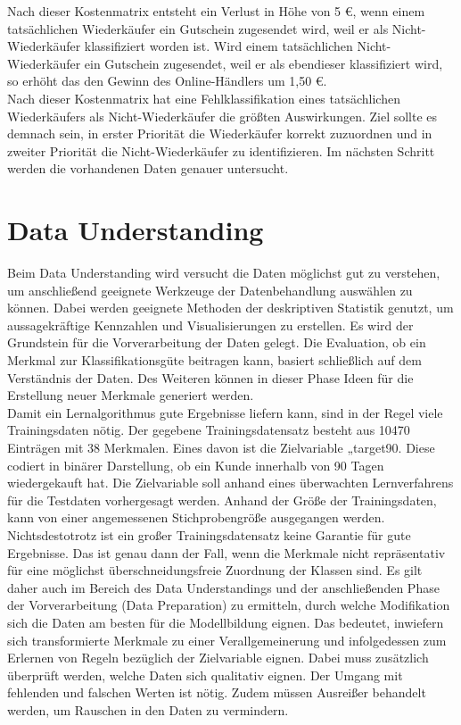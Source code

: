 Nach dieser Kostenmatrix entsteht ein Verlust in Höhe von 5 \euro{}, wenn einem tatsächlichen Wiederkäufer ein Gutschein zugesendet wird, weil er als Nicht-Wiederkäufer klassifiziert worden ist. Wird einem tatsächlichen Nicht-Wiederkäufer ein Gutschein zugesendet, weil er als ebendieser klassifiziert wird, so erhöht das den Gewinn des Online-Händlers um 1,50 \euro{}.\\

Nach dieser Kostenmatrix hat eine Fehlklassifikation eines tatsächlichen Wiederkäufers als Nicht-Wiederkäufer die größten Auswirkungen. Ziel sollte es demnach sein, in erster Priorität die Wiederkäufer korrekt zuzuordnen und in zweiter Priorität die Nicht-Wiederkäufer zu identifizieren. Im nächsten Schritt werden die vorhandenen Daten genauer untersucht.\\


\pagebreak
\section{Data Understanding}
\label{sec:datensatz}
Beim Data Understanding wird versucht die Daten möglichst gut zu verstehen, um anschließend geeignete Werkzeuge der Datenbehandlung auswählen zu können. Dabei werden geeignete Methoden der deskriptiven Statistik genutzt, um aussagekräftige Kennzahlen und Visualisierungen zu erstellen. Es wird der Grundstein für die Vorverarbeitung der Daten gelegt. Die Evaluation, ob ein Merkmal zur Klassifikationsgüte beitragen kann, basiert schließlich auf dem Verständnis der Daten. Des Weiteren können in dieser Phase Ideen für die Erstellung neuer Merkmale generiert werden.\\

Damit ein Lernalgorithmus gute Ergebnisse liefern kann, sind in der Regel viele Trainingsdaten nötig. Der gegebene Trainingsdatensatz besteht aus 10470 Einträgen mit 38 Merkmalen. Eines davon ist die Zielvariable „target90. Diese codiert in binärer Darstellung, ob ein Kunde innerhalb von 90 Tagen wiedergekauft hat. Die Zielvariable soll anhand eines überwachten Lernverfahrens für die Testdaten vorhergesagt werden. Anhand der Größe der Trainingsdaten, kann von einer angemessenen Stichprobengröße ausgegangen werden.\\

Nichtsdestotrotz ist ein großer Trainingsdatensatz keine Garantie für gute Ergebnisse. Das ist genau dann der Fall, wenn die Merkmale nicht repräsentativ für eine möglichst überschneidungsfreie Zuordnung der Klassen sind. Es gilt daher auch im Bereich des Data Understandings und der anschließenden Phase der Vorverarbeitung (Data Preparation) zu ermitteln, durch welche Modifikation sich die Daten am besten für die Modellbildung eignen. Das bedeutet, inwiefern sich transformierte Merkmale zu einer Verallgemeinerung und infolgedessen zum Erlernen von Regeln bezüglich der Zielvariable eignen. Dabei muss zusätzlich überprüft werden, welche Daten sich qualitativ eignen. Der Umgang mit fehlenden und falschen Werten ist nötig. Zudem müssen Ausreißer behandelt werden, um Rauschen in den Daten zu vermindern.\\


